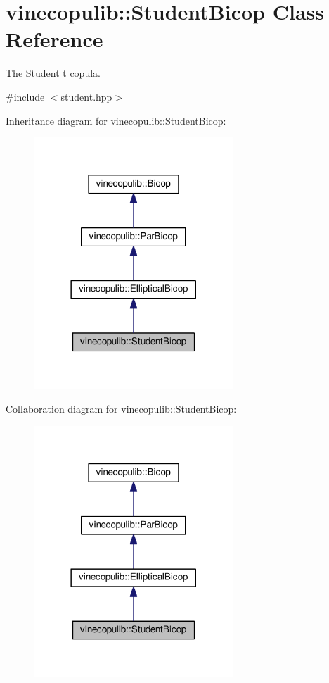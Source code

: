 \hypertarget{classvinecopulib_1_1_student_bicop}{}\section{vinecopulib\+:\+:Student\+Bicop Class Reference}
\label{classvinecopulib_1_1_student_bicop}


The Student t copula.  




{\ttfamily \#include $<$student.\+hpp$>$}



Inheritance diagram for vinecopulib\+:\+:Student\+Bicop\+:\nopagebreak
\begin{figure}[H]
\begin{center}
\leavevmode
\includegraphics[width=213pt]{classvinecopulib_1_1_student_bicop__inherit__graph}
\end{center}
\end{figure}


Collaboration diagram for vinecopulib\+:\+:Student\+Bicop\+:\nopagebreak
\begin{figure}[H]
\begin{center}
\leavevmode
\includegraphics[width=213pt]{classvinecopulib_1_1_student_bicop__coll__graph}
\end{center}
\end{figure}
